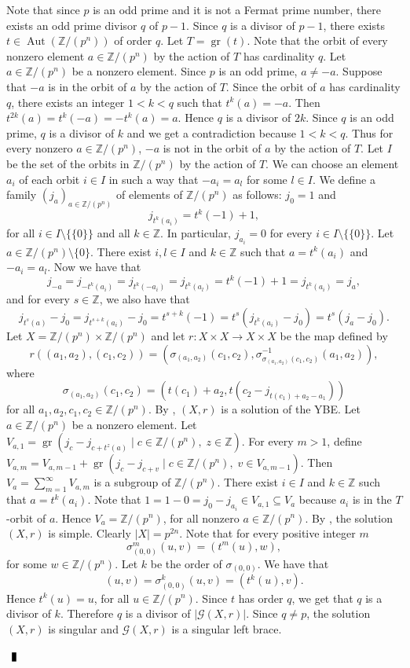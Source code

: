 \documentclass[10pt]{article}
\newcommand{\Z}{\mathbb{Z}}
\newcommand{\Aut}{\operatorname{Aut}}
\newcommand{\gr}{\operatorname{gr}}
\newenvironment{proof}{\par\noindent{ Proof.}}{$\qed$\par\bigskip}
\newcommand{\qed}{\enspace\vrule  height6pt  width4pt  depth2pt}
\begin{document}
\begin{proof} Note that since $p$ is an odd prime and it is not a Fermat prime number, there exists an odd prime divisor $q$ of $p-1$.
	Since $q$ is a divisor of $p-1$, there exists $t\in\Aut(\Z/(p^n))$ of order $q$. Let $T=\gr(t)$. Note that the orbit of every nonzero element $a\in\Z/(p^n)$ by the action of $T$ has cardinality $q$. Let $a\in\Z/(p^n)$ be a nonzero element. Since $p$ is an odd prime, $a\neq -a$. Suppose that $-a$ is in the orbit of $a$ by the action of $T$. Since the orbit of $a$ has cardinality $q$, there exists an integer $1<k<q$ such that $t^k(a)=-a$. Then $t^{2k}(a)=t^k(-a)=-t^k(a)=a$. Hence $q$ is a divisor of $2k$.  Since $q$ is an odd prime, $q$ is a divisor of $k$ and we get a contradiction because $1<k<q$. Thus for every nonzero $a\in\Z/(p^n)$, $-a$ is not in the orbit of $a$ by the action of $T$. Let $I$ be the set of the orbits in $\Z/(p^n)$ by the action of $T$. We can choose an element $a_i$ of each orbit $i\in I$ in such a way that $-a_i=a_l$ for some $l\in I$. We define a family $(j_a)_{a\in\Z/(p^n)}$ of elements of $\Z/(p^n)$ as follows: $j_0=1$  and
	$$j_{t^k(a_i)}=t^k(-1)+1,$$
	for all $i\in I\setminus\{\{ 0 \}\}$ and all $k\in \Z$. In particular, $j_{a_{i}}=0$ for every $i\in I\setminus\{\{ 0 \}\}$.
Let $a\in \Z/(p^n)\setminus\{ 0\}$. There exist $i,l\in I$ and $k\in\Z$ such that $a=t^k(a_i)$ and $-a_i=a_l$. Now we have that
	$$j_{-a}=j_{-t^k(a_i)}=j_{t^k(-a_i)}=j_{t^k(a_l)}=t^k(-1)+1=j_{t^k(a_i)}=j_{a},$$
	and for every $s\in\Z$, we also have that
	$$j_{t^s(a)}-j_0=j_{t^{s+k}(a_i)}-j_0=t^{s+k}(-1)=t^s(j_{t^k(a_i)}-j_0)=t^s(j_{a}-j_0).$$
	Let $X=\Z/(p^n)\times \Z/(p^n)$ and let $r\colon X\times X\longrightarrow X\times X$ be the map defined by
	$$r((a_1,a_2),(c_1,c_2))=(\sigma_{(a_1,a_2)}(c_1,c_2),\sigma^{-1}_{\sigma_{(a_1,a_2)}(c_1,c_2)}(a_1,a_2)),$$
	where
	$$\sigma_{(a_1,a_2)}(c_1,c_2)=(t(c_1)+a_2, t(c_2-j_{t(c_1)+a_2-a_1}))$$
	for all $a_1,a_2,c_1,c_2\in\Z/(p^n)$. By \cite[Theorem 3.1]{CO24}, $(X,r)$ is a solution of the YBE.
	Let $a\in\Z/(p^n)$ be a nonzero element. Let $V_{a,1}=\gr(j_c-j_{c+t^z(a)}\mid c\in\Z/(p^n),\; z\in\Z)$. For every $m>1$, define $V_{a,m}=V_{a,m-1}+\gr(j_c-j_{c+v}\mid c\in\Z/(p^n),\; v\in V_{a,m-1})$. Then $V_a=\sum_{m=1}^{\infty}V_{a,m}$ is a subgroup of $\Z/(p^n)$.
	There exist $i\in I$ and $k\in\Z$ such that $a=t^k(a_i)$. Note that $1=1-0=j_0-j_{a_i}\in V_{a,1}\subseteq V_a$ because $a_i$ is in the $T$-orbit of $a$. Hence $V_a=\Z/(p^n)$, for all nonzero $a\in\Z/(p^n)$. By \cite[Theorem 3.5]{CO24}, the solution $(X,r)$ is simple.
	Clearly $|X|=p^{2n}$. Note that for every positive integer $m$
	$$\sigma_{(0,0)}^m(u,v)=(t^m(u),w),$$
	for some $w\in \Z/(p^n)$. Let $k$ be the order of $\sigma_{(0,0)}$. We have that
	$$(u,v)=\sigma^{k}_{(0,0)}(u,v)=(t^k(u),v).$$
	Hence $t^k(u)=u$, for all $u\in\Z/(p^n)$. Since $t$ has order $q$, we get that $q$ is a divisor of $k$. Therefore $q$ is a divisor of $|\mathcal{G}(X,r)|$. Since $q\neq p$, the solution $(X,r)$ is singular and $\mathcal{G}(X,r)$ is a singular left brace.
	

\end{proof}
\end{document}
